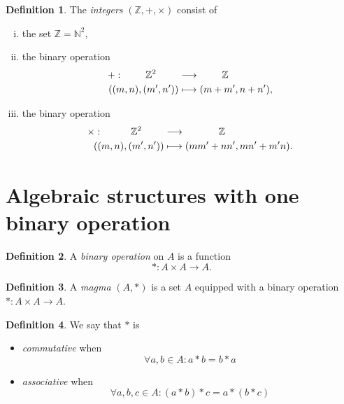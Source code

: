 \documentclass{article}
\theoremstyle{definition}
\newtheorem{definition}{Definition}
\newcommand{\N}{\mathbb{N}}
\newcommand{\Z}{\mathbb{Z}}
\begin{document}
\begin{definition}
	The \emph{integers} $(\Z,+,\times)$ consist of
	\begin{enumerate}[i.]
		\item the set $\Z=\N^2$,
		\item the binary operation
			\begin{align*}
				+:	\hspace{.8cm}\Z^2\hspace{.8cm}	&\longrightarrow	\hspace{.8cm}\Z		\\
					((m,n),(m',n'))			&\longmapsto		(m+m',n+n'),
			\end{align*}
		\item the binary operation
			\begin{align*}
				\times:	\hspace{1.0cm}\Z^2\hspace{.8cm}	&\longrightarrow	\hspace{1.2cm}\Z	\\
					((m,n),(m',n'))			&\longmapsto		(mm'+nn',mn'+m'n).
			\end{align*}
	\end{enumerate}
\end{definition}


\section*{Algebraic structures with one binary operation}

\begin{definition}
	A \emph{binary operation} on $A$ is a function
	\[
		* : A\times A \to A.
	\]
\end{definition}

\begin{definition}
	A \emph{magma} $(A,*)$ is a set $A$ equipped with a binary operation $*:A\times A\to A$.
\end{definition}

\begin{definition}
	We say that $*$ is
	\begin{itemize}
		\item \emph{commutative} when
			\[
				\forall a,b\in A : a*b = b*a
			\]
		\item \emph{associative} when
			\[
				\forall a,b,c\in A : (a*b)*c = a*(b*c)
			\]
	\end{itemize}
\end{definition}
\end{document}
